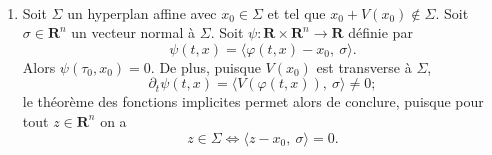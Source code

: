 \documentclass[a4paper,12pt,openany]{article}
\theoremstyle{plain}
\theoremstyle{definition}
\newcommand{\R}{\mathbf{R}}
\begin{document}
 \\

\begin{enumerate}
\item Soit $\Sigma$ un hyperplan affine avec $x_0 \in \Sigma$ et tel que $x_0 + V(x_0) \not\in\Sigma$. Soit $\sigma \in \R^n$ un vecteur normal \`a $\Sigma$. Soit $\psi : \R \times \R^n \to \R$ d\'efinie par
$$
\psi(t, x) = \langle \varphi(t,x) - x_0, ~\sigma \rangle.
$$
Alors $\psi(\tau_0, x_0) = 0$. De plus, puisque $V(x_0)$ est transverse \`a $\Sigma$,
$$
\partial_t \psi(t,x) = \langle V(\varphi(t,x)), ~\sigma \rangle \neq 0;
$$
le th\'eor\`eme des fonctions implicites permet alors de conclure, puisque pour tout $z \in \R^n$ on a 
$$
z \in \Sigma \iff \langle z - x_0, ~\sigma \rangle = 0.
$$

\end{enumerate}
\end{document}
